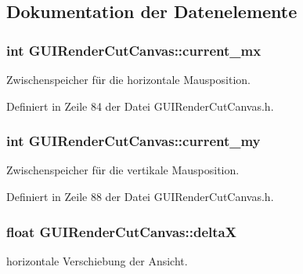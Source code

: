 \subsection{Dokumentation der Datenelemente}
\hypertarget{classGUIRenderCutCanvas_af6d75eea1254d03ed36a07a865bf48c1}{
\subsubsection[{current\-\_\-mx}]{\setlength{\rightskip}{0pt plus 5cm}int G\-U\-I\-Render\-Cut\-Canvas\-::current\-\_\-mx\hspace{0.3cm}{\ttfamily [private]}}}\label{classGUIRenderCutCanvas_af6d75eea1254d03ed36a07a865bf48c1}
Zwischenspeicher für die horizontale Mausposition. 

Definiert in Zeile 84 der Datei G\-U\-I\-Render\-Cut\-Canvas.\-h.

\hypertarget{classGUIRenderCutCanvas_a349deb05f26285eaf8207cbe45bf6603}{
\subsubsection[{current\-\_\-my}]{\setlength{\rightskip}{0pt plus 5cm}int G\-U\-I\-Render\-Cut\-Canvas\-::current\-\_\-my\hspace{0.3cm}{\ttfamily [private]}}}\label{classGUIRenderCutCanvas_a349deb05f26285eaf8207cbe45bf6603}
Zwischenspeicher für die vertikale Mausposition. 

Definiert in Zeile 88 der Datei G\-U\-I\-Render\-Cut\-Canvas.\-h.

\hypertarget{classGUIRenderCutCanvas_a28357900ca23a3d3519af015ed6333ba}{
\subsubsection[{delta\-X}]{\setlength{\rightskip}{0pt plus 5cm}float G\-U\-I\-Render\-Cut\-Canvas\-::delta\-X\hspace{0.3cm}{\ttfamily [private]}}}\label{classGUIRenderCutCanvas_a28357900ca23a3d3519af015ed6333ba}
horizontale Verschiebung der Ansicht. 

